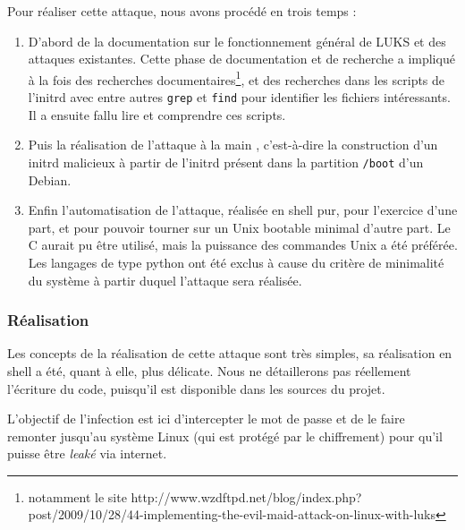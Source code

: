 \documentclass[12pt,a4paper]{article}
\begin{document}
Pour réaliser cette attaque, nous avons procédé en trois temps :
\begin{enumerate}
    \item D'abord de la documentation sur le fonctionnement général de LUKS et
    des attaques existantes. Cette phase de documentation et de recherche a
    impliqué à la fois des recherches documentaires\footnote{notamment le site
    http://www.wzdftpd.net/blog/index.php?post/2009/10/28/44-implementing-the-evil-maid-attack-on-linux-with-luks},
    et des recherches dans les scripts de l'initrd avec entre autres
    \texttt{grep} et \texttt{find} pour identifier les fichiers intéressants.
    Il a ensuite fallu lire et comprendre ces scripts.
    \item Puis la réalisation de l'attaque \og à la main \fg, c'est-à-dire la 
    construction d'un initrd malicieux à partir de l'initrd présent dans la
    partition \texttt{/boot} d'un Debian.
    \item Enfin l'automatisation de l'attaque, réalisée en shell pur, pour 
    l'exercice d'une part, et pour pouvoir tourner sur un Unix bootable minimal
    d'autre part. Le C aurait pu être utilisé, mais la puissance des commandes
    Unix a été préférée. Les langages de type python ont été exclus à cause du
    critère de minimalité du système à partir duquel l'attaque sera réalisée.
\end{enumerate}


\subsubsection*{Réalisation}
Les concepts de la réalisation de cette attaque sont très simples, sa réalisation
en shell a été, quant à elle, plus délicate. Nous ne détaillerons pas réellement
l'écriture du code, puisqu'il est disponible dans les sources du projet.

L'objectif de l'infection est ici d'intercepter le mot de passe et de le faire
remonter jusqu'au système Linux (qui est protégé par le chiffrement) pour qu'il
puisse être \textit{leaké} via internet.
\end{document}
